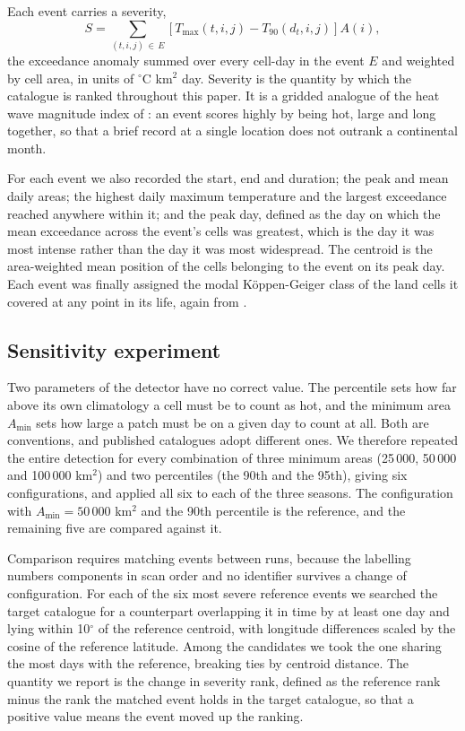 \documentclass{amsdraft}
\begin{document}
Each event carries a severity,
\begin{equation}
S = \sum_{(t,i,j)\,\in\,E}
    \left[ T_{\max}(t,i,j) - T_{90}(d_t,i,j) \right] A(i) ,
\label{eq:severity}
\end{equation}
the exceedance anomaly summed over every cell-day in the event $E$ and
weighted by cell area, in units of $^\circ$C km$^2$ day. Severity is the
quantity by which the catalogue is ranked throughout this paper. It is a
gridded analogue of the heat wave magnitude index of \citet{Russo2014}: an
event scores highly by being hot, large and long together, so that a brief
record at a single location does not outrank a continental month.

For each event we also recorded the start, end and duration; the peak and mean
daily areas; the highest daily maximum temperature and the largest exceedance
reached anywhere within it; and the peak day, defined as the day on which the
mean exceedance across the event's cells was greatest, which is the day it was
most intense rather than the day it was most widespread. The centroid is the
area-weighted mean position of the cells belonging to the event on its peak
day. Each event was finally assigned the modal K\"oppen-Geiger class of the
land cells it covered at any point in its life, again from \citet{Beck2023}.

\subsection{Sensitivity experiment}
\label{sec:sensitivity}

Two parameters of the detector have no correct value. The percentile sets how
far above its own climatology a cell must be to count as hot, and the minimum
area $A_{\min}$ sets how large a patch must be on a given day to count at all.
Both are conventions, and published catalogues adopt different ones. We
therefore repeated the entire detection for every combination of three
minimum areas (25\,000, 50\,000 and 100\,000 km$^2$) and two percentiles (the
90th and the 95th), giving six configurations, and applied all six to each of
the three seasons. The configuration with $A_{\min} = 50\,000$ km$^2$ and the
90th percentile is the reference, and the remaining five are compared against
it.

Comparison requires matching events between runs, because the labelling
numbers components in scan order and no identifier survives a change of
configuration. For each of the six most severe reference events we searched
the target catalogue for a counterpart overlapping it in time by at least one
day and lying within 10$^\circ$ of the reference centroid, with longitude
differences scaled by the cosine of the reference latitude. Among the
candidates we took the one sharing the most days with the reference, breaking
ties by centroid distance. The quantity we report is the change in severity
rank, defined as the reference rank minus the rank the matched event holds in
the target catalogue, so that a positive value means the event moved up the
ranking.
\end{document}
